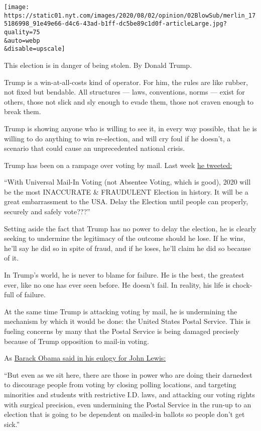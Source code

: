 \texttt{[image: https://static01.nyt.com/images/2020/08/02/opinion/02BlowSub/merlin\_175186998\_91e49e66-d4c6-43ad-b1ff-dc5be89c1d0f-articleLarge.jpg?quality=75\\\&auto=webp\\\&disable=upscale]}

This election is in danger of being stolen. By Donald Trump.

Trump is a win-at-all-costs kind of operator. For him, the rules are
like rubber, not fixed but bendable. All structures --- laws,
conventions, norms --- exist for others, those not slick and sly enough
to evade them, those not craven enough to break them.

Trump is showing anyone who is willing to see it, in every way possible,
that he is willing to do anything to win re-election, and will cry foul
if he doesn't, a scenario that could cause an unprecedented national
crisis.

Trump has been on a rampage over voting by mail. Last week
\href{https://twitter.com/realDonaldTrump/status/1288818160389558273}{he
tweeted:}

``With Universal Mail-In Voting (not Absentee Voting, which is good),
2020 will be the most INACCURATE \& FRAUDULENT Election in history. It
will be a great embarrassment to the USA. Delay the Election until
people can properly, securely and safely vote???''

Setting aside the fact that Trump has no power to delay the election, he
is clearly seeking to undermine the legitimacy of the outcome should he
lose. If he wins, he'll say he did so in spite of fraud, and if he
loses, he'll claim he did so because of it.

In Trump's world, he is never to blame for failure. He is the best, the
greatest ever, like no one has ever seen before. He doesn't fail. In
reality, his life is chock-full of failure.

At the same time Trump is attacking voting by mail, he is undermining
the mechanism by which it would be done: the United States Postal
Service. This is fueling concerns by many that the Postal Service is
being damaged precisely because of Trump opposition to mail-in voting.

As
\href{https://www.cnbc.com/2020/07/30/obama-expand-voting-rights-to-honor-late-civil-rights-icon-john-lewis.html}{Barack
Obama said in his eulogy for John Lewis:}

``But even as we sit here, there are those in power who are doing their
darnedest to discourage people from voting by closing polling locations,
and targeting minorities and students with restrictive I.D. laws, and
attacking our voting rights with surgical precision, even undermining
the Postal Service in the run-up to an election that is going to be
dependent on mailed-in ballots so people don't get sick.''

